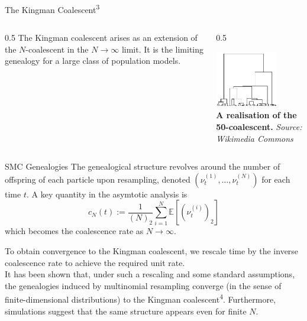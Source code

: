 \documentclass[final, 12pt]{beamer}
\newlength{\colwidth}
\newcommand{\vt}[2][t]{\nu_{#1}^{(#2)}}
\newcommand{\E}{\mathbb{E}}
\begin{document}
\begin{frame}
\begin{columns}
\begin{column}{\colwidth}
\begin{block}{The Kingman Coalescent\textsuperscript{3}}
\begin{columns}
\begin{column}{0.5\colwidth}
The Kingman coalescent arises as an extension of the $N$-coalescent in the $N\to\infty$ limit.
It is the limiting genealogy for a large class of population models.
\end{column}
\begin{column}{0.5\colwidth}
\begin{center}
\includegraphics[width=0.7\textwidth]{../kingman.png}\\
\small{
\textbf{A realisation of the 50-coalescent.}
\textit{Source: Wikimedia Commons}
}
\end{center}
\end{column}
\end{columns}
\end{block}

\begin{block}{SMC Genealogies}
The genealogical structure revolves around the number of offspring of each particle upon resampling, denoted $(\vt{1}, \dots, \vt{N})$ for each time $t$.
A key quantity in the asymtotic analysis is
\begin{equation*}
c_N(t) := \frac{1}{(N)_2} \sum_{i=1}^{N} \E\left[ (\vt{i})_2 \right]
\end{equation*}
which becomes the coalescence rate as $N\to\infty$.

To obtain convergence to the Kingman coalescent, we rescale time by the inverse coalescence rate to achieve the required unit rate.\\[10pt]

It has been shown that, under such a rescaling and some standard assumptions, the genealogies induced by multinomial resampling converge (in the sense of finite-dimensional distributions) to the Kingman coalescent\textsuperscript{4}. Furthermore, simulations suggest that the same structure appears even for finite $N$.\\[10pt]


\end{block}
\end{column}
\end{columns}
\end{frame}
\end{document}
